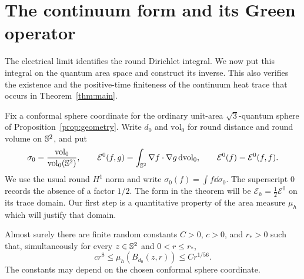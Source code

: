 \section{The continuum form and its Green operator}\label{sec:continuum}

The electrical limit identifies the round Dirichlet integral.  We now put
this integral on the quantum area space and construct its inverse.  This
also verifies the existence and the positive-time finiteness of the
continuum heat trace that occurs in Theorem~\ref{thm:main}.

Fix a conformal sphere coordinate for the ordinary unit-area
$\sqrt 3$-quantum sphere of Proposition~\ref{prop:geometry}.  Write
$d_0$ and $\mathrm{vol}_0$ for round distance and round volume on $\mathbb S^2$,
and put
\[
 \sigma_0=\frac{\mathrm{vol}_0}{\mathrm{vol}_0(\mathbb S^2)},\qquad
 \mathcal E^0(f,g)=\int_{\mathbb S^2}\nabla f\cdot\nabla g\,\mathrm d\mathrm{vol}_0,
 \qquad \mathcal E^0(f)=\mathcal E^0(f,f).
\]
We use the usual round $H^1$ norm and write $\sigma_0(f)=\int f\dd\sigma_0$.
The superscript $0$ records the absence of a factor $1/2$.  The form in
the theorem will be $\mathcal E_h=\frac12\mathcal E^0$ on its trace domain.
Our first step is a quantitative property of the area measure
$\mu_h$ which will justify that domain.

\begin{lemma}\label{lem:quantum-ball-bounds}
Almost surely there are finite random constants $C>0$, $c>0$, and
$r_*>0$ such that, simultaneously for every $z\in\mathbb S^2$ and
$0<r\le r_*$,
\begin{equation}\label{eq:quantum-ball-bounds}
 c r^{8}\le \mu_h(B_{d_0}(z,r))\le C r^{1/56}.
\end{equation}
The constants may depend on the chosen conformal sphere coordinate.
\end{lemma}

